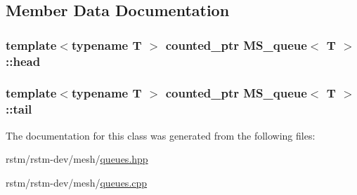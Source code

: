 \subsection{Member Data Documentation}
\hypertarget{classMS__queue_aa962c048d3b83e09562a5147d5af33fe}{
\subsubsection[{head}]{\setlength{\rightskip}{0pt plus 5cm}template$<$typename T $>$ {\bf counted\-\_\-ptr} {\bf M\-S\-\_\-queue}$<$ T $>$\-::head\hspace{0.3cm}{\ttfamily [private]}}}\label{classMS__queue_aa962c048d3b83e09562a5147d5af33fe}
\hypertarget{classMS__queue_a644daae43a3ae28f04693962eaf9698d}{
\subsubsection[{tail}]{\setlength{\rightskip}{0pt plus 5cm}template$<$typename T $>$ {\bf counted\-\_\-ptr} {\bf M\-S\-\_\-queue}$<$ T $>$\-::tail\hspace{0.3cm}{\ttfamily [private]}}}\label{classMS__queue_a644daae43a3ae28f04693962eaf9698d}


The documentation for this class was generated from the following files\-:\begin{DoxyCompactItemize}
\item 
rstm/rstm-\/dev/mesh/\hyperlink{queues_8hpp}{queues.\-hpp}\item 
rstm/rstm-\/dev/mesh/\hyperlink{queues_8cpp}{queues.\-cpp}\end{DoxyCompactItemize}
